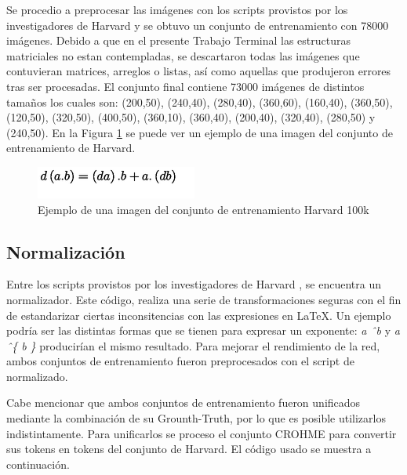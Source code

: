 Se procedio a preprocesar las imágenes con los scripts provistos por los investigadores de Harvard y se obtuvo un conjunto de entrenamiento con 78000 imágenes. Debido a que en el presente Trabajo Terminal las estructuras matriciales no estan contempladas, se descartaron todas las imágenes que contuvieran matrices, arreglos o listas, así como aquellas que produjeron errores tras ser procesadas. El conjunto final contiene 73000 imágenes de distintos tamaños los cuales son: (200,50), (240,40), (280,40), (360,60), (160,40), (360,50), (120,50), (320,50), (400,50), (360,10), (360,40), (200,40), (320,40), (280,50) y (240,50). En la Figura \ref{fig:harvard-example} se puede ver un ejemplo de una imagen del conjunto de entrenamiento de Harvard.

\begin{figure}[H]
	\centering
	\includegraphics{capitulo5/dataset/harvard}
	\caption{Ejemplo de una imagen del conjunto de entrenamiento Harvard 100k}
	\label{fig:harvard-example}
\end{figure}

\subsection{Normalización}

Entre los scripts provistos por los investigadores de Harvard \cite{harvard-scripts}, se encuentra un normalizador. Este código, realiza una serie de transformaciones seguras con el fin de estandarizar ciertas inconsitencias con las expresiones en \LaTeX{}. Un ejemplo podría ser las distintas formas que se tienen para expresar un exponente: \textit{a \^\ b} y \textit{a \^\ \{ b \}} producirían el mismo resultado. Para mejorar el rendimiento de la red, ambos conjuntos de entrenamiento fueron preprocesados con el script de normalizado.

Cabe mencionar que ambos conjuntos de entrenamiento fueron unificados mediante la combinación de su Grounth-Truth, por lo que es posible utilizarlos indistintamente. Para unificarlos se proceso el conjunto CROHME para convertir sus tokens en tokens del conjunto de Harvard. El código usado se muestra a continuación.



\newpage


